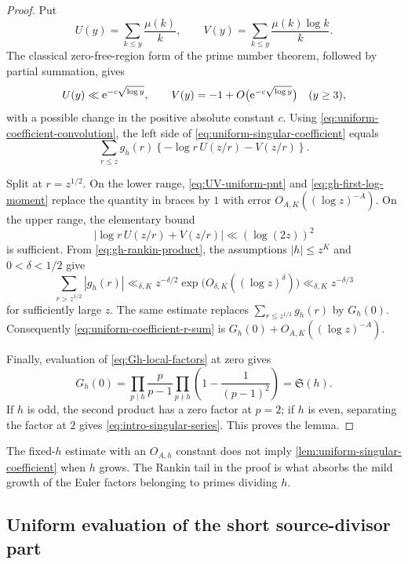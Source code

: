 \begin{proof}
Put
\[
 U(y)=\sum_{k\le y}\frac{\mu(k)}k,
 \qquad
 V(y)=\sum_{k\le y}\frac{\mu(k)\log k}{k}.
\]
The classical zero-free-region form of the prime number theorem, followed
by partial summation, gives
\begin{equation}\label{eq:UV-uniform-pnt}
 U(y)\ll \mathrm e^{-c\sqrt{\log y}},
 \qquad
 V(y)=-1+O\bigl(\mathrm e^{-c\sqrt{\log y}}\bigr)
 \quad(y\ge3),
\end{equation}
with a possible change in the positive absolute constant $c$.
Using \eqref{eq:uniform-coefficient-convolution}, the left side of
\eqref{eq:uniform-singular-coefficient} equals
\begin{equation}\label{eq:uniform-coefficient-r-sum}
 \sum_{r\le z}g_h(r)
 \left\{-\log r\,U(z/r)-V(z/r)\right\}.
\end{equation}

Split at $r=z^{1/2}$.  On the lower range,
\eqref{eq:UV-uniform-pnt} and \eqref{eq:gh-first-log-moment} replace the
quantity in braces by $1$ with error
$O_{A,K}((\log z)^{-A})$.  On the upper range, the elementary bound
\[
 |\log r\,U(z/r)+V(z/r)|\ll(\log(2z))^2
\]
is sufficient.  From \eqref{eq:gh-rankin-product}, the assumptions
$|h|\le z^K$ and $0<\delta<1/2$ give
\[
 \sum_{r>z^{1/2}}|g_h(r)|
 \ll_{\delta,K}z^{-\delta/2}
 \exp\bigl(O_{\delta,K}((\log z)^\delta)\bigr)
 \ll_{\delta,K}z^{-\delta/3}
\]
for sufficiently large $z$.  The same estimate replaces
$\sum_{r\le z^{1/2}}g_h(r)$ by $G_h(0)$.  Consequently
\eqref{eq:uniform-coefficient-r-sum} is
$G_h(0)+O_{A,K}((\log z)^{-A})$.

Finally, evaluation of \eqref{eq:Gh-local-factors} at zero gives
\begin{equation}\label{eq:Gh-zero-singular-series}
 G_h(0)=
 \prod_{p\mid h}\frac p{p-1}
 \prod_{p\nmid h}\left(1-\frac1{(p-1)^2}\right)
 =\mathfrak S(h).
\end{equation}
If $h$ is odd, the second product has a zero factor at $p=2$; if $h$ is
even, separating the factor at $2$ gives \eqref{eq:intro-singular-series}.
This proves the lemma.
\end{proof}

\begin{remark}
The fixed-$h$ estimate with an $O_{A,h}$ constant does not imply
\cref{lem:uniform-singular-coefficient} when $h$ grows.  The Rankin tail in
the proof is what absorbs the mild growth of the Euler factors belonging to
primes dividing $h$.
\end{remark}

\subsection{Uniform evaluation of the short source-divisor part}
\label{subsec:uniform-short-transfer}

